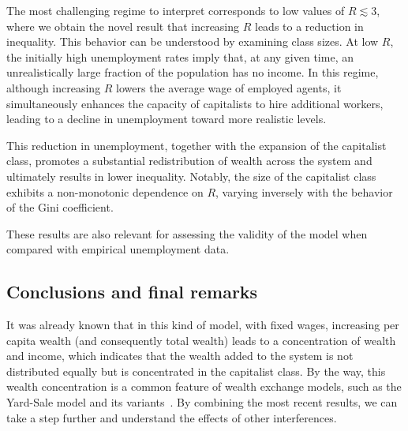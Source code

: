 The most challenging regime to interpret corresponds to low values of $R\lesssim3$, where we obtain the novel result that increasing $R$ leads to a reduction in inequality. This behavior can be understood by examining class sizes. At low $R$, the initially high unemployment rates imply that, at any given time, an unrealistically large fraction of the population has no income. In this regime, although increasing $R$ lowers the average wage of employed agents, it simultaneously enhances the capacity of capitalists to hire additional workers, leading to a decline in unemployment toward more realistic levels.

This reduction in unemployment, together with the expansion of the capitalist class, promotes a substantial redistribution of wealth across the system and ultimately results in lower inequality. Notably, the size of the capitalist class exhibits a non-monotonic dependence on $R$, varying inversely with the behavior of the Gini coefficient.

These results are also relevant for assessing the validity of the model when compared with empirical unemployment data.

\subsection{Conclusions and final remarks}

\label{sec:final}

It was already known that in this kind of model, with fixed wages, increasing per capita wealth (and consequently total wealth) leads to a concentration of wealth and income, which indicates that the wealth added to the system is not distributed equally but is concentrated in the capitalist class. By the way, this wealth concentration is a common feature of wealth exchange models, such as the Yard-Sale model and its variants~\cite{yakovenko2023,chakraborti2011,boghosian2014a,chakrabarti2013,boghosian2014}. By combining the most recent results, we can take a step further and understand the effects of other interferences.

